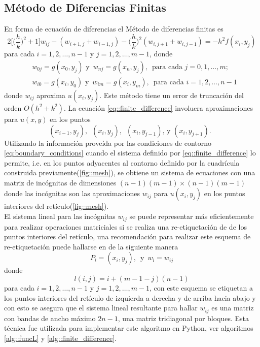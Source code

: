 \documentclass[a4paper]{article}
\begin{document}
\subsection{Método de Diferencias Finitas}
En forma de ecuación de diferencias el Método de diferencias finitas es
\begin{equation}\label{eq::finite_difference}
2\Bigg[\Bigg(\frac{h}{k}\Bigg)^2 +1  \Bigg]w_{ij}-(w_{i+1,j}+w_{i-1,j})-\Bigg(\frac{h}{k}\Bigg)^2(w_{i,j+1}+w_{i,j-1})=-h^2 f(x_i,y_j)
\end{equation}
para cada $i=1,2,\hdots,n-1$ y $j=1,2,\hdots,m-1$, donde
\begin{equation}\label{eq:boundary_conditions}
\begin{aligned}
&w_{0j}=g(x_0,y_j)\,\,\text{y }\, w_{nj}=g(x_n,y_j),\,\,\, \text{para cada } j=0,1,\hdots,m;\\
&w_{i0}=g(x_i,y_0)\,\,\text{y }\, w_{im}=g(x_i,y_m),\,\,\, \text{para cada } i=1,2,\hdots,n-1
\end{aligned}
\end{equation}
donde $w_{ij}$ aproxima $u(x_i,y_j)$. Este método tiene un error de truncación del orden $O(h^2+k^2)$. La ecuación \ref{eq::finite_difference} involucra aproximaciones para $u(x,y)$ en los puntos
\begin{equation*}
(x_{i-1},y_{j}),\,\,\,(x_{i},y_{j}),\,\,\,(x_{i},y_{j-1}),\,\text{y}\,\,(x_{i},y_{j+1}).\,\,\,
\end{equation*}
Utilizando la información proveída por las condiciones de contorno \ref{eq:boundary_conditions} cuando el sistema definido por \ref{eq::finite_difference} lo permite, i.e. en los puntos adyacentes al contorno definido por la cuadrícula construida previamente(\ref{fig::mesh}), se obtiene un sistema de ecuaciones con una matriz de incógnitas de dimensiones $(n-1)(m-1)\times(n-1)(m-1)$ donde las incógnitas son las aproximaciones $w_{ij}$ para $u(x_i,y_j)$ en los puntos interiores del retículo(\ref{fig::mesh}).\\

El sistema lineal para las incógnitas $w_{ij}$ se puede representar más eficientemente para realizar operaciones matriciales si se realiza una re-etiquetación de de los puntos interiores del retículo, una recomendación para realizar este esquema de re-etiquetación puede hallarse en \cite{Varga} de la siguiente manera
\begin{equation}
P_l=(x_i,y_j), \,\,\, \text{y}\,\,\, w_l=w_{ij}
\end{equation}
donde
\begin{equation}\label{eq::relabeling_function}
l(i,j)=i+(m-1-j)(n-1)
\end{equation} 
para cada $i=1,2,\hdots,n-1$ y $j=1,2,\hdots,m-1$, con este esquema se etiquetan a los puntos interiores del retículo de izquierda a derecha y de arriba hacia abajo y con esto se asegura que el sistema lineal resultante para hallar $w_{ij}$ es una matriz con bandas de ancho máximo $2n-1$, una matriz tridiagonal por bloques. Esta técnica fue utilizada para implementar este algoritmo en Python, ver algoritmos \ref{alg::funcL} y \ref{alg::finite_difference}.
\end{document}
